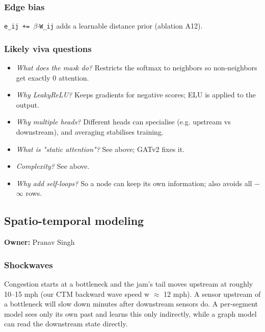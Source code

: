 \documentclass[10pt,a4paper]{article}
\begin{document}
\subsubsection*{Edge bias}
\texttt{e\_\allowbreak{}ij += \ensuremath{\beta}\ensuremath{\cdot}W\_\allowbreak{}ij} adds a learnable distance prior (ablation A12).

\subsubsection*{Likely viva questions}
\begin{itemize}[nosep,leftmargin=*]
\item \emph{What does the mask do?} Restricts the softmax to neighbors so non-neighbors get exactly 0 attention.
\item \emph{Why LeakyReLU?} Keeps gradients for negative scores; ELU is applied to the output.
\item \emph{Why multiple heads?} Different heads can specialise (e.g. upstream vs downstream), and averaging stabilises training.
\item \emph{What is "static attention"?} See above; GATv2 fixes it.
\item \emph{Complexity?} See above.
\item \emph{Why add self-loops?} So a node can keep its own information; also avoids all \ensuremath{-}\ensuremath{\infty} rows.
\end{itemize}

\subsection*{Spatio-temporal modeling}
\textbf{Owner:} Pranav Singh

\subsubsection*{Shockwaves}
Congestion starts at a bottleneck and the jam's tail moves upstream at roughly 10--15 mph (our CTM backward wave speed w \ensuremath{\approx} 12 mph). A sensor upstream of a bottleneck will slow down minutes after downstream sensors do. A per-segment model sees only its own past and learns this only indirectly, while a graph model can read the downstream state directly.
\end{document}

